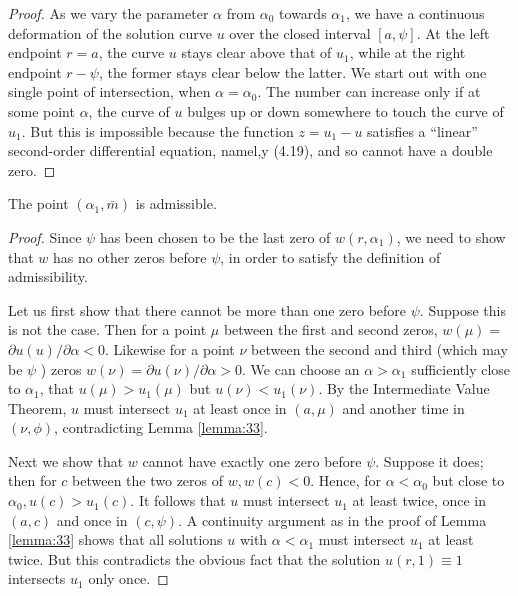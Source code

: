 \begin{proof}
  As we vary the parameter $\alpha$ from $\alpha_0$ towards $\alpha_1$,
  we have a continuous deformation of the solution curve $u$
  over the closed interval $[a, \psi]$. At the left endpoint $r=a$,
  the curve $u$ stays clear above that of $u_1$, while at the right endpoint $r-\psi$,
  the former stays clear below the latter. We start out with one single point of intersection, 
  when $\alpha=\alpha_0$. The number can increase only if at some point $\alpha$,
  the curve of $u$ bulges up or down somewhere to touch the curve of $u_1$.
  But this is impossible because the function $z=u_1-u$ satisfies a ``linear'' second-order 
  differential equation, namel,y (4.19), and so cannot have a double zero.
\end{proof}

\begin{lemma}\label{lemma:34}
  The point $\left(\alpha_1, \bar{m}\right)$ is admissible.
\end{lemma}

\begin{proof}
  Since $\psi$ has been chosen to be the last zero of $w\left(r, \alpha_1\right)$,
  we need to show that $w$ has no other zeros before $\psi$, in order to
  satisfy the definition of admissibility.
  
  Let us first show that there cannot be more than one zero before $\psi$.
  Suppose this is not the case. Then for a point $\mu$ between the first and second zeros,
  $w(\mu)=$ $\partial u(u) / \partial \alpha<0$. Likewise for a point $\nu$
  between the second and third (which may be $\psi$ )
  zeros $w(\nu)=\partial u(\nu) / \partial \alpha>0$. We can choose an $\alpha>\alpha_1$ 
  sufficiently close to
  $\alpha_1$, that $u(\mu)>u_1(\mu)$ but $u(\nu)<u_1(\nu)$. By the Intermediate Value Theorem, 
  $u$ must intersect $u_1$ at least once in $(a, \mu)$ and another time in $(\nu, \phi)$, 
  contradicting Lemma \ref{lemma:33}.

  Next we show that $w$ cannot have exactly one zero before $\psi$. Suppose it does;
  then for $c$ between the two zeros of $w, w(c)<0$. 
  Hence, for $\alpha<\alpha_0$ but close to $\alpha_0, u(c)>u_1(c)$.
  It follows that $u$ must intersect $u_1$ at least twice,
  once in $(a, c)$ and once in $(c, \psi)$. A continuity argument as in the proof of Lemma \ref{lemma:33}
  shows that all solutions $u$ with $\alpha<\alpha_1$ must intersect $u_1$ at least twice. But 
  this contradicts the obvious fact that the solution $u(r, 1) \equiv 1$ intersects $u_1$ only 
  once.
\end{proof}



